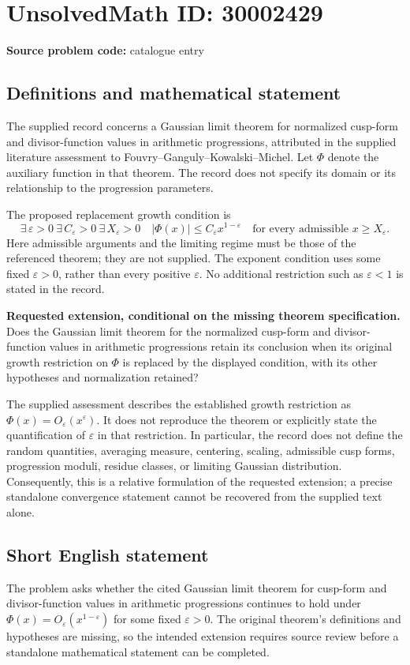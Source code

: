 \documentclass[11pt]{article}
\begin{document}
\section*{UnsolvedMath ID: 30002429}
\textbf{Source problem code:} catalogue entry
\subsection{Definitions and mathematical statement}
The supplied record concerns a Gaussian limit theorem for normalized cusp-form and divisor-function values in arithmetic progressions, attributed in the supplied literature assessment to Fouvry--Ganguly--Kowalski--Michel. Let \(\Phi\) denote the auxiliary function in that theorem. The record does not specify its domain or its relationship to the progression parameters.

The proposed replacement growth condition is
\[
\exists\,\varepsilon>0\ \exists\,C_{\varepsilon}>0\ \exists\,X_{\varepsilon}>0\quad
|\Phi(x)|\leq C_{\varepsilon}x^{1-\varepsilon}
\quad\text{for every admissible }x\geq X_{\varepsilon}.
\]
Here admissible arguments and the limiting regime must be those of the referenced theorem; they are not supplied. The exponent condition uses some fixed \(\varepsilon>0\), rather than every positive \(\varepsilon\). No additional restriction such as \(\varepsilon<1\) is stated in the record.

\textbf{Requested extension, conditional on the missing theorem specification.} Does the Gaussian limit theorem for the normalized cusp-form and divisor-function values in arithmetic progressions retain its conclusion when its original growth restriction on \(\Phi\) is replaced by the displayed condition, with its other hypotheses and normalization retained?

The supplied assessment describes the established growth restriction as \(\Phi(x)=O_{\varepsilon}(x^{\varepsilon})\). It does not reproduce the theorem or explicitly state the quantification of \(\varepsilon\) in that restriction. In particular, the record does not define the random quantities, averaging measure, centering, scaling, admissible cusp forms, progression moduli, residue classes, or limiting Gaussian distribution. Consequently, this is a relative formulation of the requested extension; a precise standalone convergence statement cannot be recovered from the supplied text alone.
\subsection{Short English statement}
The problem asks whether the cited Gaussian limit theorem for cusp-form and divisor-function values in arithmetic progressions continues to hold under \(\Phi(x)=O_{\varepsilon}(x^{1-\varepsilon})\) for some fixed \(\varepsilon>0\). The original theorem's definitions and hypotheses are missing, so the intended extension requires source review before a standalone mathematical statement can be completed.
\end{document}
